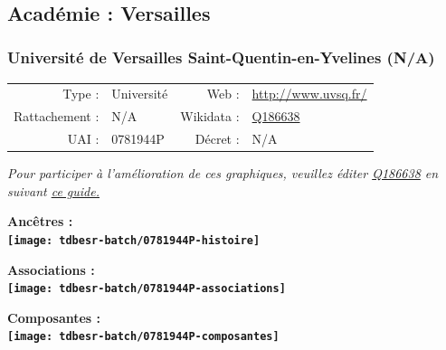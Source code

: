 \documentclass[12pt,french,]{article}
\begin{document}
\ifoddpage ~\newpage \fi   

\hypertarget{acaduxe9mie-versailles}{%
\subsection{Académie : Versailles}\label{acaduxe9mie-versailles}}

\hypertarget{universituxe9-de-versailles-saint-quentin-en-yvelines-na}{%
\subsubsection{Université de Versailles Saint-Quentin-en-Yvelines
(N/A)}\label{universituxe9-de-versailles-saint-quentin-en-yvelines-na}}

\begin{tabular*}{\textwidth}{rp{5cm}rl}  
\hline  
Type : & Université & Web : &\href{http://www.uvsq.fr/}{http://www.uvsq.fr/} \\  
Rattachement : & N/A & Wikidata : & \href{https://www.wikidata.org/entity/Q186638}{Q186638} \\  
UAI : & 0781944P & Décret : & N/A \\  
\hline  
\end{tabular*}

\textit{\scriptsize Pour participer à l'amélioration de ces graphiques, veuillez éditer  \href{https://www.wikidata.org/entity/Q186638}{Q186638}  en suivant \href{https://github.com/cpesr/wikidataESR/blob/master/Rmd/wikidataESR.md}{ce guide.}}

\vspace{1cm}  
\begin{minipage}[b]{0.50\textwidth}\begin{center} \bf Ancêtres : \\  
\texttt{[image: tdbesr-batch/0781944P-histoire]} \end{center}\end{minipage}\begin{minipage}[b]{0.50\textwidth}\begin{center} \bf Associations : \\  
\texttt{[image: tdbesr-batch/0781944P-associations]} \end{center}\end{minipage}

\hrulefill

\begin{center} \bf Composantes : \\  
\texttt{[image: tdbesr-batch/0781944P-composantes]} \end{center}
\end{document}
